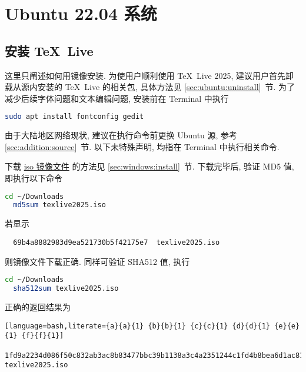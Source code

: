 
\chapter{Ubuntu 22.04 系统}

\section{安装 \TeX\ Live}\label{chap:ubuntu:sec:install}

这里只阐述如何用镜像安装.
为使用户顺利使用 \TeX\ Live 2025,
建议用户首先卸载从源内安装的 \TeX\ Live 的相关包,
具体方法见 \ref{sec:ubuntu:uninstall}~节.
为了减少后续字体问题和文本编辑问题,
安装前在 \textsf{Terminal} 中执行
\begin{lstlisting}[language=bash]
  sudo apt install fontconfig gedit
\end{lstlisting}
由于大陆地区网络现状,
建议在执行命令前更换 Ubuntu 源,
参考 \ref{sec:addition:source}~节.
以下未特殊声明,
均指在  \textsf{Terminal} 中执行相关命令.

下载
\href{https://mirrors.ctan.org/systems/texlive/Images/texlive2025.iso}{iso 镜像文件}
的方法见 \ref{sec:windows:install}~节.
下载完毕后,
验证 MD5 值,
即执行以下命令
\begin{lstlisting}[language = bash]
  cd ~/Downloads
  md5sum texlive2025.iso
\end{lstlisting}
若显示
\begin{lstlisting}
  69b4a8882983d9ea521730b5f42175e7  texlive2025.iso
\end{lstlisting}
则镜像文件下载正确.
同样可验证 SHA512 值,
执行
\begin{lstlisting}[language = bash]
  cd ~/Downloads
  sha512sum texlive2025.iso
\end{lstlisting}
正确的返回结果为
\begin{lstlisting}[language=bash,literate={a}{a}{1} {b}{b}{1} {c}{c}{1} {d}{d}{1} {e}{e}{1} {f}{f}{1}]
  1fd9a2234d086f50c832ab3ac8b83477bbc39b1138a3c4a2351244c1fd4b8bea6d1ac81d4a5b0cba95f2e82c00f0d9df5b33189eb222e4bae5dae1523ef0da0e  texlive2025.iso
\end{lstlisting}

